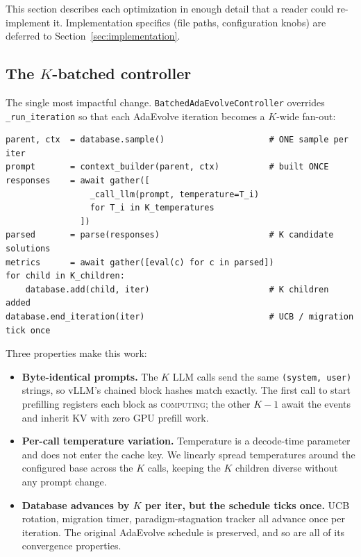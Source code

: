 \documentclass[11pt]{article}
\newcommand{\adaev}{AdaEvolve}
\newcommand{\bcontroller}{\texttt{BatchedAdaEvolveController}}
\begin{document}
This section describes each optimization in enough detail that a
reader could re-implement it. Implementation specifics (file paths,
configuration knobs) are deferred to Section~\ref{sec:implementation}.

\subsection{The $K$-batched controller}
\label{sec:approach-batched}

The single most impactful change. \bcontroller{} overrides
\verb|_run_iteration| so that each \adaev{} iteration becomes a
$K$-wide fan-out:

\begin{lstlisting}[caption={The $K$-batched iteration. Built once, fired $K$ times.},
                   label={lst:batched}]
parent, ctx  = database.sample()                     # ONE sample per iter
prompt       = context_builder(parent, ctx)          # built ONCE
responses    = await gather([
                 _call_llm(prompt, temperature=T_i)
                 for T_i in K_temperatures
               ])
parsed       = parse(responses)                      # K candidate solutions
metrics      = await gather([eval(c) for c in parsed])
for child in K_children:
    database.add(child, iter)                        # K children added
database.end_iteration(iter)                         # UCB / migration tick once
\end{lstlisting}

Three properties make this work:

\begin{itemize}
\item \textbf{Byte-identical prompts.} The $K$ LLM calls send the
  same \verb|(system, user)| strings, so vLLM's chained block hashes
  match exactly. The first call to start prefilling registers each
  block as \textsc{computing}; the other $K{-}1$ await the events
  and inherit KV with zero GPU prefill work.
\item \textbf{Per-call temperature variation.} Temperature is a
  decode-time parameter and does not enter the cache key. We linearly
  spread temperatures around the configured base across the $K$
  calls, keeping the $K$ children diverse without any prompt change.
\item \textbf{Database advances by $K$ per iter, but the schedule
  ticks once.} UCB rotation, migration timer, paradigm-stagnation
  tracker all advance once per iteration. The original \adaev{}
  schedule is preserved, and so are all of its convergence
  properties.
\end{itemize}
\end{document}

